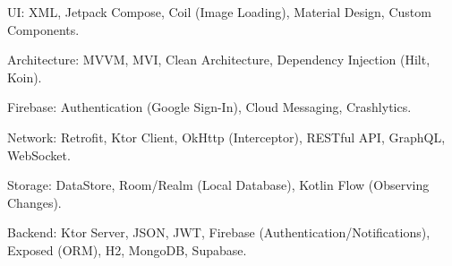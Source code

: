 \begin{cvparagraph}
    UI: XML, Jetpack Compose, Coil (Image Loading), Material Design, Custom Components.

    Architecture: MVVM, MVI, Clean Architecture, Dependency Injection (Hilt, Koin).

    Firebase: Authentication (Google Sign-In), Cloud Messaging, Crashlytics.

    Network: Retrofit, Ktor Client, OkHttp (Interceptor), RESTful API, GraphQL, WebSocket.

    Storage: DataStore, Room/Realm (Local Database), Kotlin Flow (Observing Changes).

    Backend: Ktor Server, JSON, JWT, Firebase (Authentication/Notifications), Exposed (ORM), H2, MongoDB, Supabase.
\end{cvparagraph}
